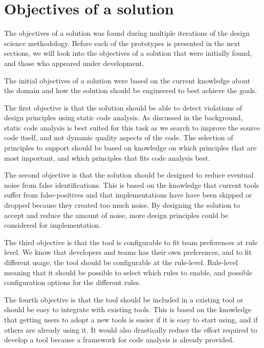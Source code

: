 \documentclass{report}
\begin{document}
\section{Objectives of a solution}

The objectives of a solution was found during multiple iterations of the design science methodology. Before each of the prototypes is presented in the next sections, we will look into the objectives of a solution that were initially found, and those who appeared under development.

The initial objectives of a solution were based on the current knowledge about the domain and how the solution should be engineered to best achieve the goals. 

The first objective is that the solution should be able to detect violations of design principles using static code analysis. As discussed in the background, static code analysis is best suited for this task as we search to improve the source code itself, and not dynamic quality aspects of the code. The selection of principles to support should be based on knowledge on which principles that are most important, and which principles that fits code analysis best. 

The second objective is that the solution should be designed to reduce eventual noise from false identifications. This is based on the knowledge that current tools suffer from false-positives and that implementations have have been skipped or dropped because they created too much noise. By designing the solution to accept and reduce the amount of noise, more design principles could be considered for implementation.

The third objective is that the tool is configurable to fit team preferences at rule level. We know that developers and teams has their own preferences, and to fit different usage, the tool should be configurable at the rule-level. Rule-level meaning that it should be possible to select which rules to enable, and possible configuration options for the different rules.

The fourth objective is that the tool should be included in a existing tool or should be easy to integrate with existing tools. This is based on the knowledge that getting users to adopt a new tools is easier if it is easy to start using, and if others are already using it. It would also drastically reduce the effort required to develop a tool because a framework for code analysis is already provided. 
\end{document}
